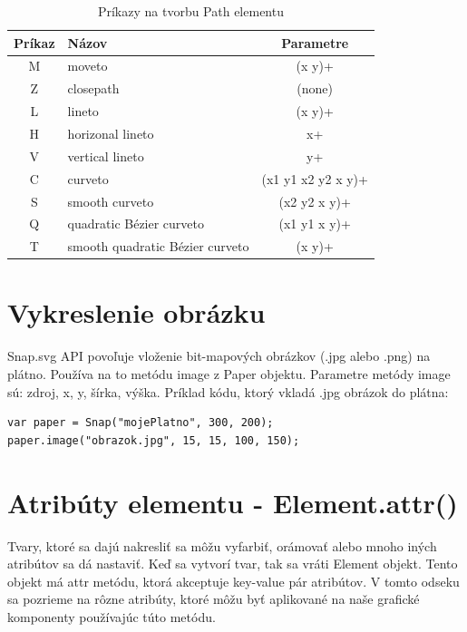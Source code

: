 \begin{center}
	\begin{table}[H]
		\begin{center}
			\begin{tabular}{|c|l|c|}
				\hline \textbf{Príkaz} & \textbf{Názov} & \textbf{Parametre} \\
				\hline
				\hline M & moveto & (x y)+ \\ 
				\hline Z & closepath & (none) \\ 
				\hline L & lineto & (x y)+ \\ 
				\hline H & horizonal lineto & x+ \\ 
				\hline V & vertical lineto & y+ \\ 
				\hline C & curveto & (x1 y1 x2 y2 x y)+ \\ 
				\hline S & smooth curveto & (x2 y2 x y)+ \\ 
				\hline Q & quadratic Bézier curveto & (x1 y1 x y)+ \\ 
				\hline T & smooth quadratic Bézier curveto & (x y)+ \\ 
				\hline 
			\end{tabular} 
		\end{center}
		\caption{Príkazy na tvorbu Path elementu}
		\label{prikazy:Path}
	\end{table}
\end{center}


\section{Vykreslenie obrázku}
Snap.svg API povoľuje vloženie bit-mapových obrázkov (.jpg alebo .png) na plátno. Používa na to metódu image z Paper objektu. Parametre metódy image sú: zdroj, x, y, šírka, výška. Príklad kódu, ktorý vkladá .jpg obrázok do plátna:

\begin{lstlisting}
var paper = Snap("mojePlatno", 300, 200);
paper.image("obrazok.jpg", 15, 15, 100, 150);
\end{lstlisting}


\section{Atribúty elementu - Element.attr()}

Tvary, ktoré sa dajú nakresliť sa môžu vyfarbiť, orámovať alebo mnoho iných atribútov sa dá nastaviť. Keď sa vytvorí tvar, tak sa vráti Element objekt. Tento objekt má attr metódu, ktorá akceptuje key-value pár atribútov. V tomto odseku sa pozrieme na rôzne atribúty, ktoré môžu byť aplikované na naše grafické komponenty používajúc túto metódu. 

